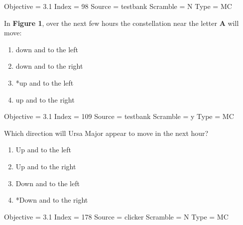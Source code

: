 \documentclass[11pt]{article}
\begin{document}
\begin{enumerate}
\begin{minipage}{\textwidth}
\begin{minipage}{\textwidth}
Objective = 3.1
Index = 98
Source = testbank
Scramble = N
Type = MC
\end{minipage}
\end{minipage}
\vskip 0.20in

\begin{minipage}{\textwidth}
\begin{minipage}{\textwidth}
\item In {\bf Figure 1}, over the next few hours the constellation near the letter {\bf A} will move:
\begin{multicols}{2}
\begin{enumerate} 
\setlength{\itemsep}{1pt} 
\setlength{\parskip}{0pt} 
\setlength{\parsep}{0pt}
\setlength{\multicolsep}{1pt} 
\item down and to the left
\item down and to the right
\item *up and to the left
\item up and to the right
\end{enumerate} 
\vfill 
\end{multicols}

Objective = 3.1
Index = 109
Source = testbank
Scramble = y
Type = MC
\end{minipage}
\end{minipage}
\vskip 0.20in

\begin{minipage}{\textwidth}
\begin{minipage}{\textwidth}
\item Which direction will Ursa Major appear to move in the next hour?
\begin{multicols}{2}
\begin{enumerate} 
\setlength{\itemsep}{1pt} 
\setlength{\parskip}{0pt} 
\setlength{\parsep}{0pt}
\setlength{\multicolsep}{1pt} 
\item Up and to the left
\item Up and to the right
\item Down and to the left
\item *Down and to the right
\end{enumerate} 
\vfill 
\end{multicols}

Objective = 3.1
Index = 178
Source = clicker
Scramble = N
Type = MC
\end{minipage}
\end{minipage}
\vskip 0.20in


\end{enumerate}
\end{document}
